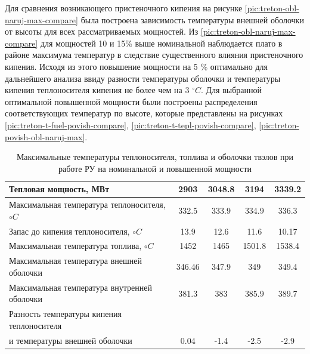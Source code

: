 Для сравнения возникающего пристеночного кипения на рисунке \ref{pic:treton-obl-naruj-max-compare} была построена зависимость температуры внешней оболочки от высоты для всех рассматриваемых мощностей. Из \ref{pic:treton-obl-naruj-max-compare} для мощностей 10 и 15\% выше номинальной наблюдается плато в районе максимума температур в следствие существенного влияния пристеночного кипения. Исходя из этого повышение мощности на 5 \% оптимально для дальнейшего анализа ввиду разности температуры оболочки и температуры кипения теплоносителя кипения не более чем на 3 $^\circ C$. 
Для выбранной оптимальной повышенной мощности были построены распределения соответствующих температур по высоте, которые представлены на рисунках \ref{pic:treton-t-fuel-povish-compare}, \ref{pic:treton-t-tepl-povish-compare}, \ref{pic:treton-povish-obl-naruj-max}. 


\begin{table}[H]
    \caption{Максимальные температуры теплоносителя, топлива и оболочки твэлов при работе РУ на номинальной и повышенной мощности}
    \begin{center}
        \begin{tabular}{|l|c|c|c|c|}
        \toprule
        Тепловая мощность, МВт & 2903 & 3048.8 & 3194 & 3339.2 \\
        \midrule
        \hline
        Максимальная температура теплоносителя, $\circ C$ & 332.5 & 333.9 & 334.9 & 336.3  \\ 
        \hline
        Запас до кипения теплоносителя, $\circ C$ & 13.9 & 12.6 & 11.6 &  10.17 \\
        \hline
        Максимальная температура топлива, $\circ C$ & 1452 & 1465 & 1501.8 & 1538.4  \\
        \hline
        Максимальная температура внешней оболочки & 346.46 & 347.9 & 349  & 349.4 \\
        \hline
        Максимальная температура внутренней оболочки & 381.3 & 383 & 385.9 & 389.7 \\
        \hline
        Разность температуры кипения теплоносителя\\ и температуры внешней оболочки & 0.04 & -1.4 & -2.5 & -2.9 \\
        \bottomrule
        \end{tabular}
		\label{tabular:t_max_nominal_compare}
    \end{center}
\end{table}

